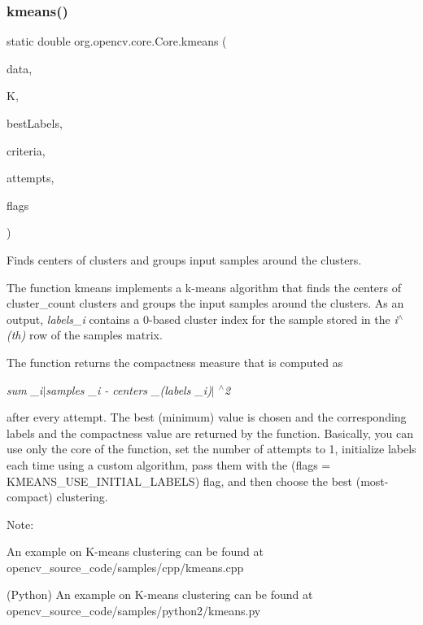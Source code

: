 \subsubsection{\texorpdfstring{kmeans()}{kmeans()}\hspace{0.1cm}{\footnotesize\ttfamily [2/2]}}
{\footnotesize\ttfamily static double org.\+opencv.\+core.\+Core.\+kmeans (\begin{DoxyParamCaption}\item[{\mbox{\hyperlink{classorg_1_1opencv_1_1core_1_1_mat}{Mat}}}]{data,  }\item[{int}]{K,  }\item[{\mbox{\hyperlink{classorg_1_1opencv_1_1core_1_1_mat}{Mat}}}]{best\+Labels,  }\item[{\mbox{\hyperlink{classorg_1_1opencv_1_1core_1_1_term_criteria}{Term\+Criteria}}}]{criteria,  }\item[{int}]{attempts,  }\item[{int}]{flags }\end{DoxyParamCaption})\hspace{0.3cm}{\ttfamily [static]}}

Finds centers of clusters and groups input samples around the clusters.

The function {\ttfamily kmeans} implements a k-\/means algorithm that finds the centers of {\ttfamily cluster\+\_\+count} clusters and groups the input samples around the clusters. As an output, {\itshape labels\+\_\+i} contains a 0-\/based cluster index for the sample stored in the {\itshape i$^\wedge$(th)} row of the {\ttfamily samples} matrix.

The function returns the compactness measure that is computed as

{\itshape sum \+\_\+i$\vert$samples \+\_\+i -\/ centers \+\_\+(labels \+\_\+i)$\vert$ $^\wedge$2}

after every attempt. The best (minimum) value is chosen and the corresponding labels and the compactness value are returned by the function. Basically, you can use only the core of the function, set the number of attempts to 1, initialize labels each time using a custom algorithm, pass them with the ({\ttfamily flags} = {\ttfamily K\+M\+E\+A\+N\+S\+\_\+\+U\+S\+E\+\_\+\+I\+N\+I\+T\+I\+A\+L\+\_\+\+L\+A\+B\+E\+LS}) flag, and then choose the best (most-\/compact) clustering.

Note\+:


\begin{DoxyItemize}
\item An example on K-\/means clustering can be found at opencv\+\_\+source\+\_\+code/samples/cpp/kmeans.\+cpp 
\item (Python) An example on K-\/means clustering can be found at opencv\+\_\+source\+\_\+code/samples/python2/kmeans.\+py 
\end{DoxyItemize}


